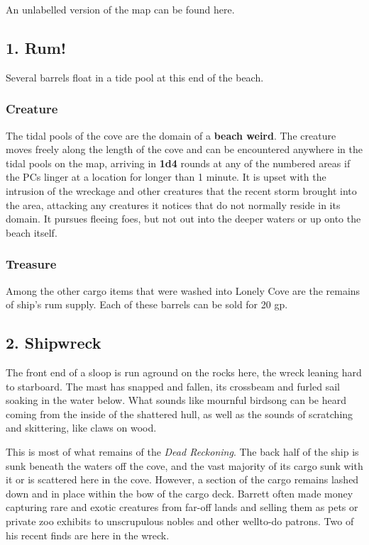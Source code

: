 \documentclass[10pt,a4paper,twoside,bg=print,twocolumn,openany,nodeprecatedcode]{dndbook}
\begin{document}
An unlabelled version of the map can be found here.

\subsection{1. Rum!}
\begin{DndReadAloud}{}
Several barrels float in a tide pool at this end of the beach.

\end{DndReadAloud}

\subsubsection{Creature}
The tidal pools of the cove are the domain of a \textbf{beach weird}. The creature moves freely along the length of the cove and can be encountered anywhere in the tidal pools on the map, arriving in \textbf{1d4} rounds at any of the numbered areas if the PCs linger at a location for longer than 1 minute. It is upset with the intrusion of the wreckage and other creatures that the recent storm brought into the area, attacking any creatures it notices that do not normally reside in its domain. It pursues fleeing foes, but not out into the deeper waters or up onto the beach itself.

\subsubsection{Treasure}
Among the other cargo items that were washed into Lonely Cove are the remains of ship's rum supply. Each of these barrels can be sold for 20 gp.

\subsection{2. Shipwreck}
\begin{DndReadAloud}{}
The front end of a sloop is run aground on the rocks here, the wreck leaning hard to starboard. The mast has snapped and fallen, its crossbeam and furled sail soaking in the water below. What sounds like mournful birdsong can be heard coming from the inside of the shattered hull, as well as the sounds of scratching and skittering, like claws on wood.

\end{DndReadAloud}

This is most of what remains of the \textit{Dead Reckoning}. The back half of the ship is sunk beneath the waters off the cove, and the vast majority of its cargo sunk with it or is scattered here in the cove. However, a section of the cargo remains lashed down and in place within the bow of the cargo deck. Barrett often made money capturing rare and exotic creatures from far-off lands and selling them as pets or private zoo exhibits to unscrupulous nobles and other wellto-do patrons. Two of his recent finds are here in the wreck.
\end{document}
